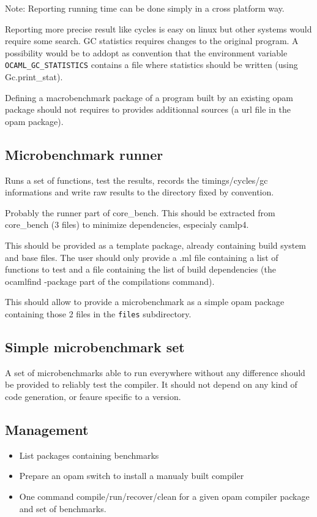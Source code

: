 \documentclass[11pt,a4paper]{article}
\begin{document}
Note: Reporting running time can be done simply in a cross platform
way.

Reporting more precise result like cycles is easy on linux but
other systems would require some search. GC statistics requires
changes to the original program. A possibility would be to addopt as
convention that the environment variable
\texttt{OCAML\_GC\_STATISTICS} contains a file where statistics should
be written (using Gc.print\_stat).

Defining a macrobenchmark package of a program built by an existing
opam package should not requires to provides additionnal sources (a
url file in the opam package).

\subsection{Microbenchmark runner}

Runs a set of functions, test the results, records the
timings/cycles/gc informations and write raw results to the directory
fixed by convention.

Probably the runner part of core\_bench. This should be extracted from
core\_bench (3 files) to minimize dependencies, especialy camlp4.

This should be provided as a template package, already containing
build system and base files. The user should only provide a .ml file
containing a list of functions to test and a file containing the list
of build dependencies (the ocamlfind -package part of the compilations
command).

This should allow to provide a microbenchmark as a simple opam package
containing those 2 files in the \texttt{files} subdirectory.

\subsection{Simple microbenchmark set}

A set of microbenchmarks able to run everywhere without any difference
should be provided to reliably test the compiler. It should not depend
on any kind of code generation, or feaure specific to a version.

\subsection{Management}

\begin{itemize}
\item List packages containing benchmarks
\item Prepare an opam switch to install a manualy built compiler
\item One command compile/run/recover/clean for a given opam compiler
  package and set of benchmarks.
\end{itemize}
\end{document}
